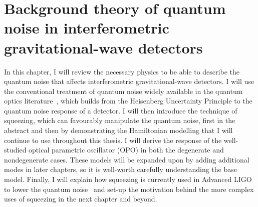 \chapter{Background theory of quantum noise in interferometric gravitational-wave detectors} %
\label{chp:background_theory}





In this chapter, I will review the necessary physics to be able to describe the quantum noise that affects interferometric gravitational-wave detectors. I will use the conventional treatment of quantum noise widely available in the quantum optics literature~\cite{Danilishin,MiaoQCRB}, which builds from the Heisenberg Uncertainty Principle to the quantum noise response of a detector. I will then introduce the technique of squeezing, which can favourably manipulate the quantum noise, first in the abstract and then by demonstrating the Hamiltonian modelling that I will continue to use throughout this thesis. I will derive the response of the well-studied optical parametric oscillator (OPO) in both the degenerate and nondegenerate cases. These models will be expanded upon by adding additional modes in later chapters, so it is well-worth carefully understanding the base model. Finally, I will explain how squeezing is currently used in Advanced LIGO to lower the quantum noise~\cite{} and set-up the motivation behind the more complex uses of squeezing in the next chapter and beyond.


